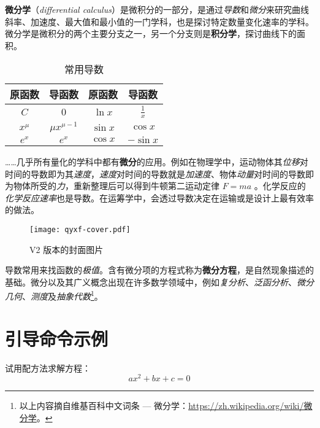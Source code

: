 \documentclass[
  10pt,
  twoside,
  openany,
  b5paper, %
  colorscheme = bootstrap-v4, %
]{qyxf-book}
\begin{document}
\textbf{微分学}（\emph{differential calculus}）是微积分的一部分，是通过\emph{导数}和\emph{微分}来研究曲线斜率、加速度、最大值和最小值的一门学科，也是探讨特定数量变化速率的学科。微分学是微积分的两个主要分支之一，另一个分支则是\textbf{积分学}，探讨曲线下的面积。


\begin{table}[htbp]
  \centering
  \caption{常用导数}
  \begin{tabular}{cccc}
    \toprule
    \textbf{原函数} & \textbf{导函数}   & \textbf{原函数} & \textbf{导函数} \\
    \midrule
    $C$             & $0$               & $\ln x$         & $\frac{1}{x}$   \\
    $x^\mu$         & $\mu x^{\mu - 1}$ & $\sin x$        & $\cos x$        \\
    $e^x$           & $e^x$             & $\cos x$        & $-\sin x$       \\
    \bottomrule
  \end{tabular}
\end{table}

……几乎所有量化的学科中都有\textbf{微分}的应用。例如在物理学中，运动物体其\emph{位移}对时间的导数即为其\emph{速度}，\emph{速度}对时间的导数就是\emph{加速度}、物体\emph{动量}对时间的导数即为物体所受的\emph{力}，重新整理后可以得到牛顿第二运动定律 $F=ma$ 。化学反应的\emph{化学反应速率}也是导数。在运筹学中，会透过导数决定在运输或是设计上最有效率的做法。

\begin{figure}[htbp]
  \centering
  \texttt{[image: qyxf-cover.pdf]}
  \caption{V2 版本的封面图片}
  \label{fig:qyxf-logo}
\end{figure}

导数常用来找函数的\emph{极值}。含有微分项的方程式称为\textbf{微分方程}，是自然现象描述的基础。微分以及其广义概念出现在许多数学领域中，例如\emph{复分析}、\emph{泛函分析}、\emph{微分几何}、\emph{测度}及\emph{抽象代数}\footnote{以上内容摘自维基百科中文词条 --- 微分学：\url{https://zh.wikipedia.org/wiki/微分学}。}。

\section{引导命令示例}

 试用配方法求解方程：
\begin{equation}\label{eq:quadratic}
  ax^2 + bx + c = 0
\end{equation}
\end{document}
